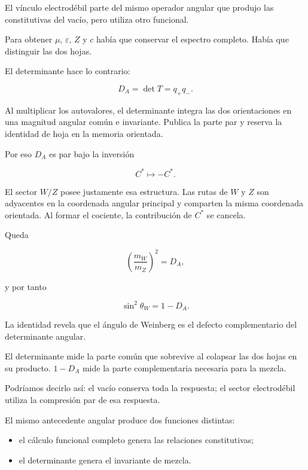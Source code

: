 El vínculo electrodébil parte del mismo operador angular que produjo las constitutivas del vacío, pero utiliza otro funcional.\par

Para obtener \(\mu\), \(\varepsilon\), \(Z\) y \(c\) había que conservar el espectro completo. Había que distinguir las dos hojas.\par

El determinante hace lo contrario:\par

\[
D_A=\det T=q_+q_-.
\]

Al multiplicar los autovalores, el determinante integra las dos orientaciones en una magnitud angular común e invariante. Publica la parte par y reserva la identidad de hoja en la memoria orientada.\par

Por eso \(D_A\) es par bajo la inversión\par

\[
C^*\longmapsto-C^*.
\]

El sector \(W/Z\) posee justamente esa estructura. Las rutas de \(W\) y \(Z\) son adyacentes en la coordenada angular principal y comparten la misma coordenada orientada. Al formar el cociente, la contribución de \(C^*\) se cancela.\par

Queda\par

\[
\left(\frac{m_W}{m_Z}\right)^2
=
D_A,
\]

y por tanto\par

\[
\sin^2\theta_W
=
1-D_A.
\]

La identidad revela que el ángulo de Weinberg es el defecto complementario del determinante angular.\par

El determinante mide la parte común que sobrevive al colapsar las dos hojas en su producto. \(1-D_A\) mide la parte complementaria necesaria para la mezcla.\par

Podríamos decirlo así: el vacío conserva toda la respuesta; el sector electrodébil utiliza la compresión par de esa respuesta.\par

El mismo antecedente angular produce dos funciones distintas:\par

\begin{itemize}[leftmargin=*,itemsep=0.35em]
\item el cálculo funcional completo genera las relaciones constitutivas;
\item el determinante genera el invariante de mezcla.
\end{itemize}


